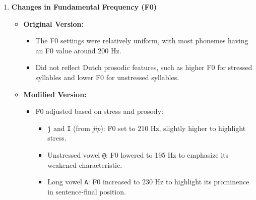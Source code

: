 \documentclass{../labbook}
\begin{document}
\begin{solution}
\begin{enumerate}
    \item \textbf{Changes in Fundamental Frequency (F0)}
    \begin{itemize}
        \item \textbf{Original Version:}
        \begin{itemize}
            \item The F0 settings were relatively uniform, with most phonemes having an F0 value around 200 Hz.
            \item Did not reflect Dutch prosodic features, such as higher F0 for stressed syllables and lower F0 for unstressed syllables.
        \end{itemize}
        \item \textbf{Modified Version:}
        \begin{itemize}
            \item F0 adjusted based on stress and prosody:
            \begin{itemize}
                \item \texttt{j} and \texttt{I} (from \textit{jip}): F0 set to 210 Hz, slightly higher to highlight stress.
                \item Unstressed vowel \texttt{@}: F0 lowered to 195 Hz to emphasize its weakened characteristic.
                \item Long vowel \texttt{A}: F0 increased to 230 Hz to highlight its prominence in sentence-final position.
            \end{itemize}
        \end{itemize}
    \end{itemize}


\end{enumerate}
\end{solution}
\end{document}
